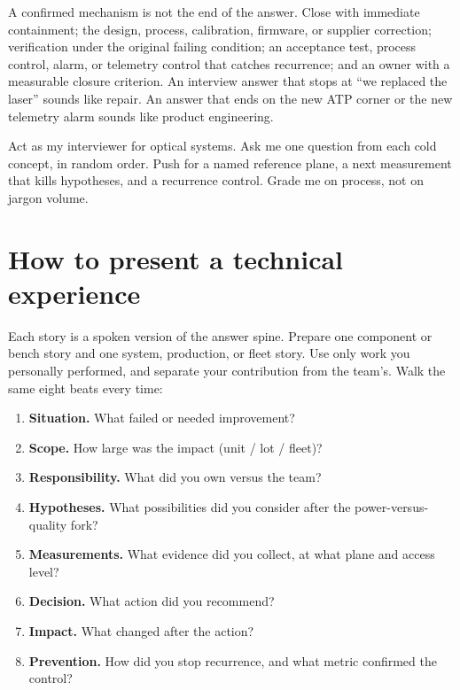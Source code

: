 A confirmed mechanism is not the end of the answer. Close with immediate containment;
the design, process, calibration, firmware, or supplier correction;
verification under the original failing condition; an acceptance test,
process control, alarm, or telemetry control that catches recurrence; and an
owner with a measurable closure criterion. An interview answer that stops at
``we replaced the laser'' sounds like repair. An answer that ends on the new
ATP corner or the new telemetry alarm sounds like product
engineering.

{Act as my interviewer for optical systems. Ask me one question from each cold
concept, in random order. Push for a named reference plane, a next measurement
that kills hypotheses, and a recurrence control. Grade me on process, not on
jargon volume.}

\section{How to present a technical experience}
\label{sec:interview-story-template}

Each story is a spoken version of the answer spine. Prepare one component or
bench story and one system, production, or fleet story. Use only work you
personally performed, and separate your contribution from the team's. Walk
the same eight beats every time:

\begin{enumerate}
\item \textbf{Situation.} What failed or needed improvement?
\item \textbf{Scope.} How large was the impact (unit / lot / fleet)?
\item \textbf{Responsibility.} What did you own versus the team?
\item \textbf{Hypotheses.} What possibilities did you consider after the
      power-versus-quality fork?
\item \textbf{Measurements.} What evidence did you collect, at what plane and
      access level?
\item \textbf{Decision.} What action did you recommend?
\item \textbf{Impact.} What changed after the action?
\item \textbf{Prevention.} How did you stop recurrence, and what metric
      confirmed the control?
\end{enumerate}

